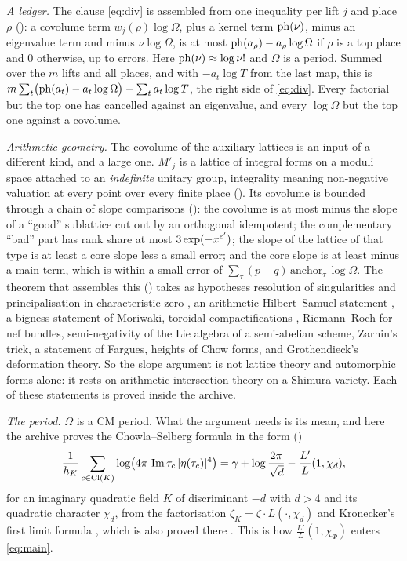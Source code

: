 \emph{A ledger.} The clause \eqref{eq:div} is assembled from one inequality per lift $j$ and
place $\rho$ \lvP{} (): a covolume term
$w_j(\rho)\log\Omega$, plus a kernel term $\operatorname{ph}(\nu)$, minus an eigenvalue term and minus
$\nu\log\Omega$, is at most $\operatorname{ph}(a_\rho)-a_\rho\log\Omega$ if $\rho$ is a top place and $0$
otherwise, up to errors. Here $\operatorname{ph}(\nu)\approx\log\nu!$ and $\Omega$ is a period. Summed over
the $m$ lifts and all places, and with $-a_t\log T$ from the last map, this is
$m\sum_t\bigl(\operatorname{ph}(a_t)-a_t\log\Omega\bigr)-\sum_ta_t\log T$, the right side of \eqref{eq:div}.
Every factorial but the top one has cancelled against an eigenvalue, and every
$\log\Omega$ but the top one against a covolume.

\emph{Arithmetic geometry.} The covolume of the auxiliary lattices is an input of a different
kind, and a large one. $M'_j$ is a lattice of integral forms on a moduli space attached to an
\emph{indefinite} unitary group, integrality meaning non-negative valuation at every point over
every finite place \lvS{} (). Its covolume is bounded through a chain of slope
comparisons \lvS{} (): the covolume is at most minus the slope of a ``good''
sublattice cut out by an orthogonal idempotent; the complementary ``bad'' part has rank share
at most $3\exp(-x^{\varepsilon'})$; the slope of the lattice of that type is at least a core slope
less a small error; and the core slope is at least minus a main term, which is within a small
error of $\sum_\tau(p-q)\,\mathrm{anchor}_\tau\,\log\Omega$. The theorem that assembles this
\lvS{} () takes as hypotheses resolution of singularities and
principalisation in characteristic zero \cite{hironaka1964}, an arithmetic Hilbert--Samuel
statement \cite{gilletsoule1992,zhang1995,abbesbouche1995}, a bigness statement of Moriwaki,
toroidal compactifications \cite{faltingschai1990,lan2013}, Riemann--Roch for nef bundles,
semi-negativity of the Lie algebra of a semi-abelian scheme, Zarhin's trick, a statement of
Fargues, heights of Chow forms, and Grothendieck's deformation theory. So the slope argument
is not lattice theory and automorphic forms alone: it rests on arithmetic intersection theory
on a Shimura variety. Each of these statements is proved inside the archive.

\emph{The period.} $\Omega$ is a CM period. What the argument needs is its mean, and here the
archive proves the Chowla--Selberg formula
\cite{chowla1949epstein,selbergchowla1967} in the form \lvS{} ()
\begin{equation}\label{eq:cs}
\frac1{h_K}\sum_{c\in\mathrm{Cl}(K)}\log\bigl(4\pi\,\operatorname{Im}\tau_c\,\lvert \eta(\tau_c)\rvert^4\bigr)
=\gamma+\log\frac{2\pi}{\sqrt d}-\frac{L'}{L}(1,\chi_d),
\end{equation}
for an imaginary quadratic field $K$ of discriminant $-d$ with $d>4$ and its quadratic character
$\chi_d$, from the factorisation $\zeta_K=\zeta\cdot L(\cdot,\chi_d)$ and
Kronecker's first limit formula \cite{siegel1980advanced}, which is also proved there \lvS. This is how
$\tfrac{L'}{L}(1,\chi_\Phi)$ enters \eqref{eq:main}.


